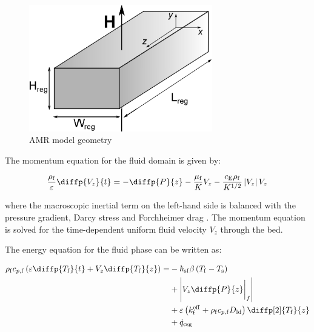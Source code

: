 \documentclass[referee]{svjour3}
\begin{document}

\begin{figure}[!ht]
  \centering
  \includegraphics[width=8cm]{Fig1-reg3d}
  \caption{AMR model geometry}
  \label{fig:amrmodel}
\end{figure}


The momentum equation for the fluid domain is given by:

\begin{equation}
\label{eq:75}
  \frac{\rho\ped{f}}{\varepsilon} \diffp{V_z}{t}= -\diffp{P}{z} - \frac{\mu\ped{f}}{K} V_z - \frac{c\ped{E} \rho\ped{f}}{K^{1/2}} \left| V_z\right| V_z 
\end{equation}



\noindent where the macroscopic inertial term on the left-hand side is balanced with the pressure gradient, Darcy stress and Forchheimer drag \cite{bib:nield06_convec_porous_media}. The momentum equation is solved for the time-dependent uniform fluid velocity $V_z$ through the bed. 

The energy equation for the fluid phase can be written as:

\begin{equation}
\label{eq:78}
\begin{split}
  \rho\ped{f} c_{p,\mathrm{f}} \left(\varepsilon \diffp{T\ped{f}}{t} + V_z\diffp{T\ped{f}}{z}\right) = & -\hheat\ped{sf} \beta \left(T\ped{f} - T\ped{s}\right) \\
& + \left|V_z\diffp{P}{z}\bigg|_f \right| \\
& + \varepsilon\left(k\ped{f}\ap{eff}  +\rho\ped{f} c_{p,\mathrm{f}} D\ped{ld}\right)\diffp[2]{T\ped{f}}{z} \\
& + \rate{q}\ped{csg}  
\end{split}
\end{equation}
\end{document}
